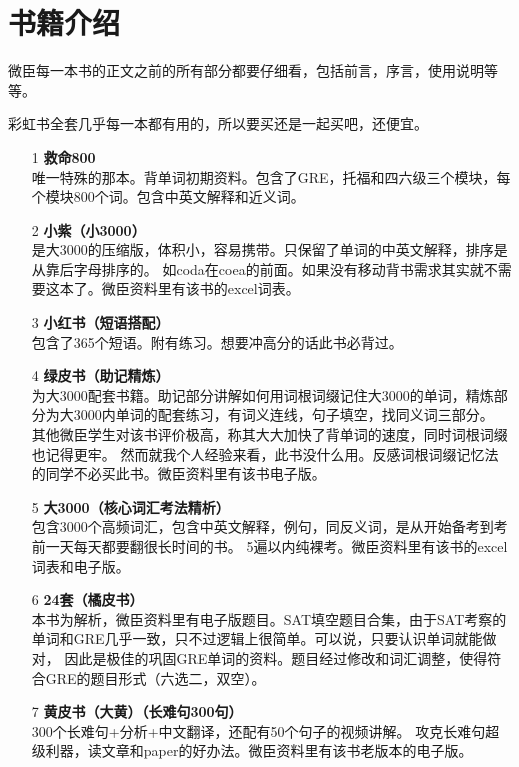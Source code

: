 \documentclass[blue, pc, cn]{elegantnote}
\begin{document}
    \newpage
    \tableofcontents
    \newpage
    
    \section[1]{书籍介绍}
        微臣每一本书的正文之前的所有部分都要仔细看，包括前言，序言，使用说明等等。

        彩虹书全套几乎每一本都有用的，所以要买还是一起买吧，还便宜。

        \begin{enumerate}
            \item[1]\textbf{救命800}\\唯一特殊的那本。背单词初期资料。包含了GRE，托福和四六级三个模块，每个模块800个词。包含中英文解释和近义词。
            \item[2]\textbf{小紫（小3000）}\\是大3000的压缩版，体积小，容易携带。只保留了单词的中英文解释，排序是从靠后字母排序的。
                    如coda在coea的前面。如果没有移动背书需求其实就不需要这本了。微臣资料里有该书的excel词表。
            \item[3]\textbf{小红书（短语搭配）}\\包含了365个短语。附有练习。想要冲高分的话此书必背过。
            \item[4] \textbf{绿皮书（助记精炼）}\\为大3000配套书籍。助记部分讲解如何用词根词缀记住大3000的单词，精炼部分为大3000内单词的配套练习，有词义连线，句子填空，找同义词三部分。
                    其他微臣学生对该书评价极高，称其大大加快了背单词的速度，同时词根词缀也记得更牢。
                    然而就我个人经验来看，此书没什么用。反感词根词缀记忆法的同学不必买此书。微臣资料里有该书电子版。
            \item[5]\textbf{ 大3000（核心词汇考法精析）}\\包含3000个高频词汇，包含中英文解释，例句，同反义词，是从开始备考到考前一天每天都要翻很长时间的书。
                    5遍以内纯裸考。微臣资料里有该书的excel词表和电子版。
            \item[6]\textbf{ 24套（橘皮书）}\\本书为解析，微臣资料里有电子版题目。SAT填空题目合集，由于SAT考察的单词和GRE几乎一致，只不过逻辑上很简单。可以说，只要认识单词就能做对，
            因此是极佳的巩固GRE单词的资料。题目经过修改和词汇调整，使得符合GRE的题目形式（六选二，双空）。
            \item[7]\textbf{黄皮书（大黄）（长难句300句）}\\300个长难句+分析+中文翻译，还配有50个句子的视频讲解。
            攻克长难句超级利器，读文章和paper的好办法。微臣资料里有该书老版本的电子版。


\end{enumerate}
\end{document}
